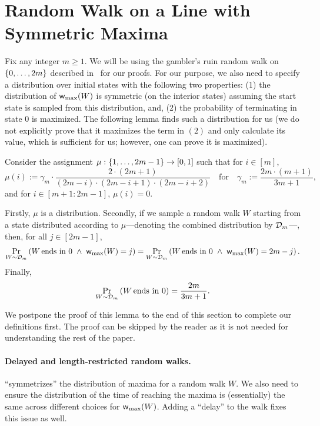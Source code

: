 

\section{Random Walk on a Line with Symmetric Maxima}\label{sec:random-walk}

Fix any integer $m \geq 1$. We will be using the gambler's ruin random walk on $\left\{ 0,\ldots,2m \right\}$ described in~ for our proofs. 
For our purpose, we also need to specify a distribution over initial states with the following two properties: (1) the distribution of $\textnormal{\textsf{w}}_{\textnormal{max}}(W)$ is symmetric (on the interior states) assuming the start state is sampled from this distribution, 
and, (2) the probability of terminating in state $0$ is maximized. The following lemma finds such a distribution for us (we do not explicitly prove that it maximizes the term in $(2)$ and only 
calculate its value, which is sufficient for us; however, one can prove it is maximized). 

\begin{lemma}\label{lem:start-state}
	Consider the assignment $\mu: \left\{ 1,\ldots,2m-1 \right\} \rightarrow [0,1]$ such that for $i \in [m]$,
	\[
		\mu(i) := \gamma_{m} \cdot \frac{2 \cdot (2m+1)}{(2m-i)\cdot(2m-i+1)\cdot(2m-i+2)} \quad \text{for} \quad \gamma_m := \frac{2m \cdot (m+1)}{3m+1},
	\]
	and for $i \in [m+1:2m-1]$, $\mu(i)=0$. 
	
	Firstly, $\mu$ is a distribution. Secondly, if we sample a random walk $W$ starting from a state distributed according to $\mu$---denoting the combined distribution by $\mathcal{D}_m$---, then, for all $j \in [2m-1]$, 
	\[
		\operatorname*{\textnormal{Pr}}_{W \sim \mathcal{D}_m}\left(\text{$W$\!~ends in $0$} ~\wedge~ \textnormal{\textsf{w}}_{\textnormal{max}}(W) = j\right) = \operatorname*{\textnormal{Pr}}_{W \sim \mathcal{D}_m}\left(\text{$W$\!~ends in $0$} ~\wedge~ \textnormal{\textsf{w}}_{\textnormal{max}}(W) = 2m-j\right). 
	\]
	Finally, 
	\[
		\operatorname*{\textnormal{Pr}}_{W \sim \mathcal{D}_m}\left(\text{$W$\!~ends in $0$}\right) = \frac{2m}{3m+1}. 
	\]
\end{lemma}

We postpone the proof of this lemma to the end of this section to complete our definitions first. The proof can be skipped by the reader as it is not needed for understanding the rest of the paper. 

\paragraph{Delayed and length-restricted random walks.}  ``symmetrizes'' the distribution of maxima for a random walk $W$. We also need to ensure the distribution of the time of reaching 
the maxima is (essentially) the same across different choices for $\textnormal{\textsf{w}}_{\textnormal{max}}(W)$. Adding a ``delay'' to the walk fixes this issue as well.  

